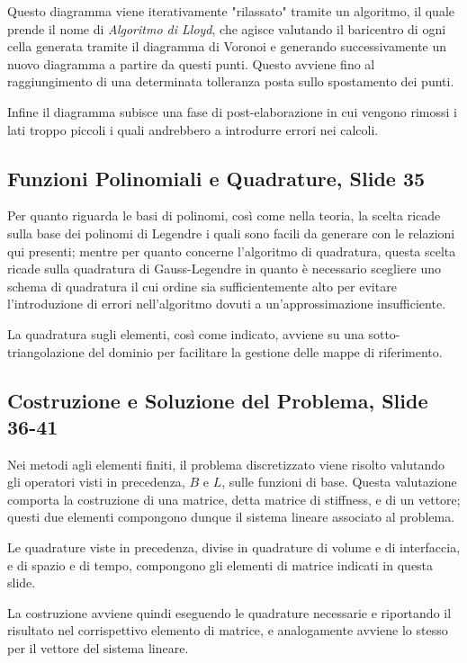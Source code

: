 \documentclass[12pt]{article}
\begin{document}
    Questo diagramma viene iterativamente "rilassato" tramite un algoritmo, il quale prende il nome di \textit{Algoritmo di Lloyd}, che agisce valutando il baricentro di ogni cella generata tramite il diagramma di Voronoi e generando successivamente un nuovo diagramma a partire da questi punti. Questo avviene fino al raggiungimento di una determinata tolleranza posta sullo spostamento dei punti.

    Infine il diagramma subisce una fase di post-elaborazione in cui vengono rimossi i lati troppo piccoli i quali andrebbero a introdurre errori nei calcoli.

    \subsection{Funzioni Polinomiali e Quadrature, Slide 35}

    Per quanto riguarda le basi di polinomi, così come nella teoria, la scelta ricade sulla base dei polinomi di Legendre i quali sono facili da generare con le relazioni qui presenti; mentre per quanto concerne l'algoritmo di quadratura, questa scelta ricade sulla quadratura di Gauss-Legendre in quanto è necessario scegliere uno schema di quadratura il cui ordine sia sufficientemente alto per evitare l'introduzione di errori nell'algoritmo dovuti a un'approssimazione insufficiente.

    La quadratura sugli elementi, così come indicato, avviene su una sotto-triangolazione del dominio per facilitare la gestione delle mappe di riferimento.

    \subsection{Costruzione e Soluzione del Problema, Slide 36-41}

    Nei metodi agli elementi finiti, il problema discretizzato viene risolto valutando gli operatori visti in precedenza, $B$ e $L$, sulle funzioni di base. Questa valutazione comporta la costruzione di una matrice, detta matrice di stiffness, e di un vettore; questi due elementi compongono dunque il sistema lineare associato al problema.

    Le quadrature viste in precedenza, divise in quadrature di volume e di interfaccia, e di spazio  e di tempo, compongono gli elementi di matrice indicati in questa slide.

    La costruzione avviene quindi eseguendo le quadrature necessarie e riportando il risultato nel corrispettivo elemento di matrice, e analogamente avviene lo stesso per il vettore del sistema lineare.
\end{document}
